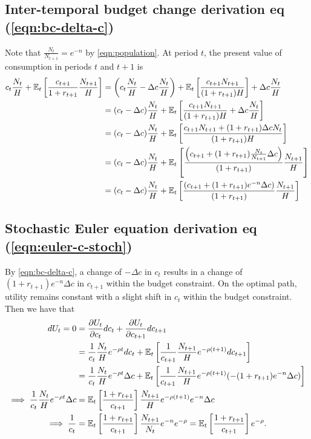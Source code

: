 \documentclass[../main.tex]{subfiles}
\begin{document}
    \subsection{Inter-temporal budget change derivation eq (\ref{eqn:bc-delta-c})}\label{app:bc-delta-c}
        Note that $\frac{N_t}{N_{t+1}} = e^{-n}$ by \eqref{eqn:population}. At period $t$, the present value of  consumption in periods $t$ and $t+1$ is
        \begin{align}
            c_{t}\frac{N_{t}}{H} + \mathbb{E}_t\left[\frac{c_{t+1}}{1+r_{t+1}}\frac{N_{t+1}}{H}\right]
            &= \left(c_{t}\frac{N_{t}}{H} - \Delta c \frac{N_{t}}{H} \right)+ \mathbb{E}_t\left[ \frac{c_{t+1}N_{t+1}}{(1+r_{t+1})H}\right] + \Delta c \frac{N_{t}}{H}
            \\
            &= (c_{t} - \Delta c)\frac{N_{t}}{H}
            + \mathbb{E}_t\left[ \frac{c_{t+1}N_{t+1}}{(1+r_{t+1})H}+ \Delta c \frac{N_{t}}{H} \right]
            \\
            &= (c_{t} - \Delta c)\frac{N_{t}}{H}
            + \mathbb{E}_t\left[\frac{c_{t+1} N_{t+1} + (1+r_{t+1}) \Delta c N_t}{(1+r_{t+1})H}\right]
            \\
            &= (c_{t} - \Delta c)\frac{N_{t}}{H}
            + \mathbb{E}_t\left[\frac{\left( c_{t+1}
                + (1+r_{t+1}) \frac{N_t}{N_{t+1}} \Delta c \right)}{(1+r_{t+1})}\frac{N_{t+1}}{H}\right]
            \\
            &= (c_{t} - \Delta c)\frac{N_{t}}{H}
            + \mathbb{E}_t\left[\frac{\left( c_{t+1}
                + (1+r_{t+1}) e^{-n} \Delta c \right)}{(1+r_{t+1})}\frac{N_{t+1}}{H}\right]
        \end{align}
    
    \subsection{Stochastic Euler equation derivation eq (\ref{eqn:euler-c-stoch})}\label{app:euler-c-stoch}
    
    By \eqref{eqn:bc-delta-c}, a change of $-\Delta c$ in  $c_t$ results in a change of $(1+r_{t+1}) e^{-n} \Delta c$ in $c_{t+1}$ within the budget constraint. On the optimal path, utility remains constant with a slight shift in $c_{t}$ within the budget constraint. Then we have that
    \begin{align}
            d U_t = 0
            &= \frac{\partial U_t}{\partial c_t} dc_t + \frac{\partial U_t}{\partial c_{t+1}} dc_{t+1}
            \\
            &= \frac{1}{c_t}\frac{N_t}{H}e^{-\rho t} dc_t + \mathbb{E}_t\left[\frac{1}{c_{t+1}}\frac{N_{t+1}}{H}e^{-\rho (t+1)} dc_{t+1}\right]
            \\
            &= \frac{1}{c_t}\frac{N_t}{H}e^{-\rho t} \Delta c + \mathbb{E}_t\left[\frac{1}{c_{t+1}}\frac{N_{t+1}}{H}e^{-\rho (t+1)}  (-(1+r_{t+1})e^{-n}  \Delta c)\right]
            \\ \implies
            \frac{1}{c_t} \frac{N_t}{H}e^{-\rho t} \Delta c
            &= \mathbb{E}_t\left[\frac{1+r_{t+1}}{c_{t+1}}\right] \frac{N_{t+1}}{H}e^{-\rho (t+1)}e^{-n} \Delta c 
            \\ \implies
            \frac{1}{c_t}
            &= \mathbb{E}_t\left[\frac{1+r_{t+1}}{c_{t+1}}\right] \frac{N_{t+1}}{N_t}e^{-n}e^{-\rho} = \mathbb{E}_t\left[\frac{1+r_{t+1}}{c_{t+1}}\right] e^{-\rho}.
        \end{align}
    
\end{document}

